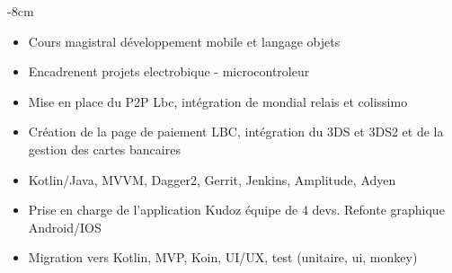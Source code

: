\documentclass[10pt,a4paper]{altacv}
\begin{document}

\begin{adjustwidth}{}{-8cm}
\makecvheader
\end{adjustwidth}


\begin{itemize}
\item Cours magistral développement mobile et langage objets
\item Encadrenent projets electrobique - microcontroleur 
\end{itemize}

\divider

\begin{itemize}
\item Mise en place du P2P Lbc, intégration de mondial relais et colissimo 
\item Création de la page de paiement LBC, intégration du 3DS et 3DS2 et de la gestion des cartes bancaires
\item Kotlin/Java, MVVM, Dagger2, Gerrit, Jenkins, Amplitude, Adyen 
\end{itemize}

\divider

\begin{itemize}
\item Prise en charge de l'application Kudoz équipe de 4 devs. Refonte graphique Android/IOS
\item Migration vers Kotlin, MVP, Koin, UI/UX, test (unitaire, ui, monkey)
\end{itemize}
\end{document}
